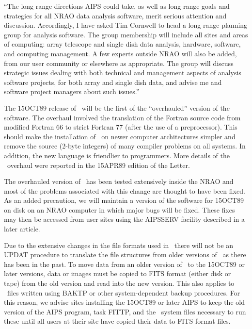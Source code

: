 {     ``The long range directions AIPS could take, as well as long range
goals and strategies for all NRAO data analysis software, merit
serious attention and discussion.  Accordingly, I have asked Tim
Cornwell to head a long range planning group for analysis software.
The group membership will include all sites and areas of computing:
array telescope and single dish data analysis, hardware, software, and
computing management.  A few experts outside NRAO will also be added,
from our user community or elsewhere as appropriate.  The group will
discuss strategic issues dealing with both technical and management
aspects of analysis software projects, for both array and single dish
data, and advise me and software project managers about such issues.''

}




   The 15OCT89 release of \AIPS\ will be the first of the
``overhauled'' version of the software.  The overhaul involved the
translation of the Fortran source code from modified Fortran 66 to
strict Fortran 77 (after the use of a preprocessor).  This should make
the installation of \AIPS\ on newer computer architectures simpler and
remove the source (2-byte integers) of many compiler problems on all
systems.  In addition, the new language is friendlier to programmers.
More details of the \AIPS\ overhaul were reported in the 15APR89
edition of the \AIPS Letter.

   The overhauled version of \AIPS\ has been tested extensively inside
the NRAO and most of the problems associated with this change are
thought to have been fixed.  As an added precaution, we will maintain
a version of the software for 15OCT89 on disk on an NRAO computer in
which major bugs will be fixed.  These fixes may then be accessed from
user sites using the AIPSSERV facility described in a later article.

   Due to the extensive changes in the file formats used in \AIPS\
there will not be an UPDAT procedure to translate the file structures
from older versions of \AIPS\ as there has been in the past.  To move
data from an older version of \AIPS\ to the 15OCT89 or later versions,
data or images must be copied to FITS format (either disk or tape)
from the old version and read into the new version.  This also applies
to \AIPS\ files written using BAKTP or other system-dependent backup
procedures.  For this reason, we advise sites installing the 15OCT89
or later AIPS to keep the old version of the AIPS program, task FITTP,
and the \AIPS\ system files necessary to run these until all users at
their site have copied their data to FITS format files.

